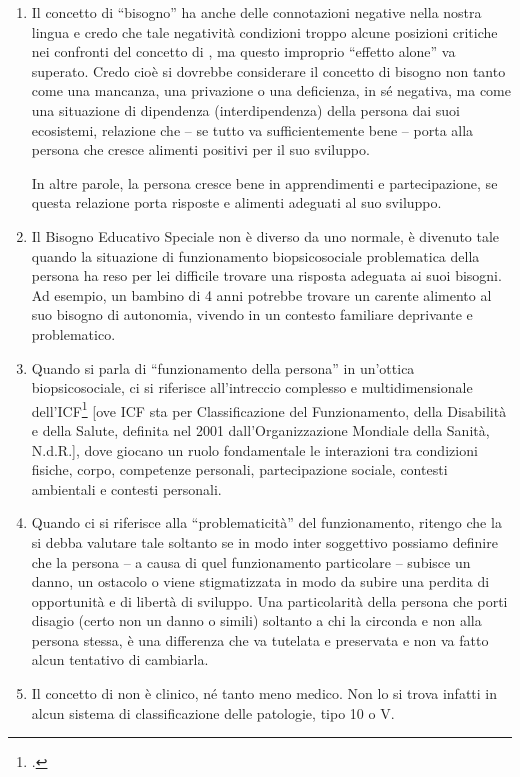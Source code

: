 \begin{enumerate}
	\item Il concetto di “bisogno” ha anche delle connotazioni negative nella nostra lingua e credo che tale negatività condizioni troppo alcune posizioni critiche nei confronti del concetto di  , ma questo improprio “effetto alone” va superato. Credo cioè si dovrebbe considerare il concetto di bisogno non tanto come una mancanza, una privazione o una deficienza, in sé negativa, ma come una situazione di dipendenza (interdipendenza) della persona dai suoi ecosistemi, relazione che – se tutto va sufficientemente bene – porta alla persona che cresce alimenti positivi per il suo sviluppo.
	
	In altre parole, la persona cresce bene in apprendimenti e partecipazione, se questa relazione porta risposte e alimenti adeguati al suo sviluppo.
	\item Il Bisogno Educativo Speciale non è diverso da uno normale, è divenuto tale quando la situazione di funzionamento biopsicosociale problematica della persona ha reso per lei difficile trovare una risposta adeguata ai suoi bisogni. Ad esempio, un bambino di 4 anni potrebbe trovare un carente alimento al suo bisogno di autonomia, vivendo in un contesto familiare deprivante e problematico.
	\item Quando si parla di “funzionamento della persona” in un'ottica biopsicosociale, ci si riferisce all'intreccio complesso e multidimensionale dell'ICF\footcite{icf} [ove ICF sta per Classificazione del Funzionamento, della Disabilità e della Salute, definita nel 2001 dall'Organizzazione Mondiale della Sanità, N.d.R.], dove giocano un ruolo fondamentale le interazioni tra condizioni fisiche, corpo, competenze personali, partecipazione sociale, contesti ambientali e contesti personali.
	\item Quando ci si riferisce alla “problematicità” del funzionamento, ritengo che la si debba valutare tale soltanto se in modo inter soggettivo possiamo definire che la persona – a causa di quel funzionamento particolare – subisce un danno, un ostacolo o viene stigmatizzata in modo da subire una perdita di opportunità e di libertà di sviluppo. Una particolarità della persona che porti disagio (certo non un danno o simili) soltanto a chi la circonda e non alla persona stessa, è una differenza che va tutelata e preservata e non va fatto alcun tentativo di cambiarla.
	\item Il concetto di   non è clinico, né tanto meno medico. Non lo si trova infatti in alcun sistema di classificazione delle patologie, tipo  10 o  V.

\end{enumerate}
